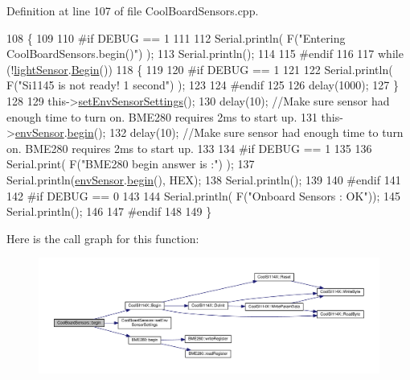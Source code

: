 Definition at line 107 of file Cool\+Board\+Sensors.\+cpp.


\begin{DoxyCode}
108 \{  
109 
110 \textcolor{preprocessor}{#if DEBUG == 1 }
111      
112     Serial.println( F(\textcolor{stringliteral}{"Entering CoolBoardSensors.begin()"}) );
113     Serial.println();
114 
115 \textcolor{preprocessor}{#endif}
116 
117     \textcolor{keywordflow}{while} (!\hyperlink{class_cool_board_sensors_ac711c27d0927eb5e73be77f092c48be0}{lightSensor}.\hyperlink{class_cool_s_i114_x_a206b36aca7049f63be1d11088c30a09f}{Begin}()) 
118     \{
119     
120 \textcolor{preprocessor}{    #if DEBUG == 1}
121 
122         Serial.println( F(\textcolor{stringliteral}{"Si1145 is not ready!  1 second"}) );
123 
124 \textcolor{preprocessor}{    #endif}
125 
126         delay(1000);
127     \}
128      
129     this->\hyperlink{class_cool_board_sensors_a406307ffd70272282d91479c7ed8d66f}{setEnvSensorSettings}();
130     delay(10);  \textcolor{comment}{//Make sure sensor had enough time to turn on. BME280 requires 2ms to start up.}
131     this->\hyperlink{class_cool_board_sensors_a868e38985e9a2412829fa2790ca13e2e}{envSensor}.\hyperlink{class_b_m_e280_a994c102f010547f9c740a338ef9905c7}{begin}();
132     delay(10);  \textcolor{comment}{//Make sure sensor had enough time to turn on. BME280 requires 2ms to start up.}
133 
134 \textcolor{preprocessor}{#if DEBUG == 1 }
135     
136     Serial.print( F(\textcolor{stringliteral}{"BME280 begin answer is :"}) );
137     Serial.println(\hyperlink{class_cool_board_sensors_a868e38985e9a2412829fa2790ca13e2e}{envSensor}.\hyperlink{class_b_m_e280_a994c102f010547f9c740a338ef9905c7}{begin}(), HEX);
138     Serial.println();
139 
140 \textcolor{preprocessor}{#endif}
141 
142 \textcolor{preprocessor}{#if DEBUG == 0}
143 
144     Serial.println( F(\textcolor{stringliteral}{"Onboard Sensors : OK"}));
145     Serial.println();
146 
147 \textcolor{preprocessor}{#endif}
148 
149 \}
\end{DoxyCode}
Here is the call graph for this function\+:\nopagebreak
\begin{figure}[H]
\begin{center}
\leavevmode
\includegraphics[width=350pt]{de/d46/class_cool_board_sensors_a97095823ef7c8f5290812f1405b966b3_cgraph}
\end{center}
\end{figure}
